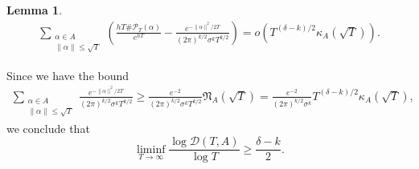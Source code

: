 \documentclass[11pt]{amsart}
\newtheorem{lemma}[theorem]{Lemma}%
\theoremstyle{definition}
\numberwithin{equation}{section}
\numberwithin{theorem}{section}
\begin{document}
\begin{lemma}\label{lem:approximate_version2}
\begin{align*}
\sum_{\substack{\alpha \in A \\ \|\alpha\| \le \sqrt{T}}}
\left(\frac{hT\#\mathscr P_T(\alpha)}{e^{hT}}
- \frac{e^{-\|\alpha\|^2/2T}}{(2\pi)^{k/2} \sigma^k T^{k/2}}\right)
= 
o\left(T^{(\delta-k)/2} \kappa_A( \sqrt{T})\right).
\end{align*}
\end{lemma}

Since we have the bound
\begin{align*}
\sum_{\substack{\alpha \in A \\ \|\alpha\| \le \sqrt{T}}}
 \frac{e^{-\|\alpha\|^2/2T}}{(2\pi)^{k/2} \sigma^k T^{k/2}}
 \ge \frac{e^{-2}}{(2\pi)^{k/2} \sigma^k T^{k/2}} \mathfrak N_A(\sqrt{T})
 =  \frac{e^{-2}}{(2\pi)^{k/2} \sigma^k} T^{(\delta-k)/2} \kappa_A(\sqrt{T}),
\end{align*}
we conclude that 
\[
\liminf_{T \to \infty} \frac{\log \mathscr D(T,A)}{\log T} \ge \frac{\delta-k}{2}.
\]
\end{document}
